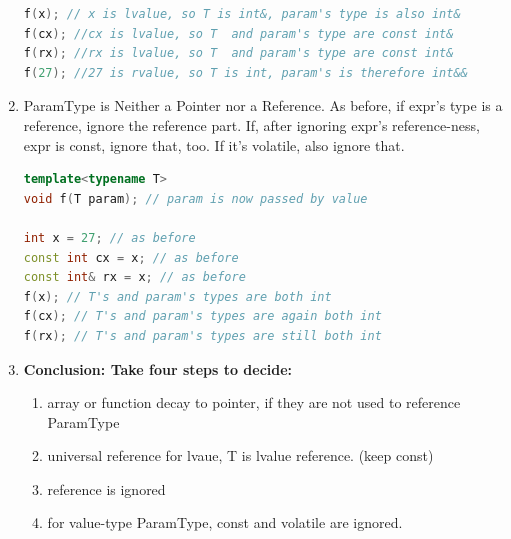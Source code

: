 \documentclass[a4paper,12pt,twoside]{book}
\begin{document}
\begin{enumerate}
\begin{lstlisting}[frame=single, language=c++]
f(x); // x is lvalue, so T is int&, param's type is also int&
f(cx); //cx is lvalue, so T  and param's type are const int&
f(rx); //rx is lvalue, so T  and param's type are const int&
f(27); //27 is rvalue, so T is int, param's is therefore int&&
\end{lstlisting}

\item ParamType is Neither a Pointer nor a Reference. As before, if expr's type is a reference, ignore the reference part. If, after ignoring expr's reference-ness, expr is const, ignore that, too. If it's
volatile, also ignore that.
\begin{lstlisting}[frame=single, language=c++]
template<typename T>
void f(T param); // param is now passed by value

int x = 27; // as before
const int cx = x; // as before
const int& rx = x; // as before
f(x); // T's and param's types are both int
f(cx); // T's and param's types are again both int
f(rx); // T's and param's types are still both int
\end{lstlisting}

\item \textbf{Conclusion:  Take four steps to decide:}
\begin{enumerate}
\item array or function decay to pointer, if they are not used to reference ParamType
\item universal reference for lvaue, T is lvalue reference. (keep const)
\item reference is ignored
\item for value-type ParamType, const and volatile are ignored.
\end{enumerate}



\end{enumerate}
\end{document}
